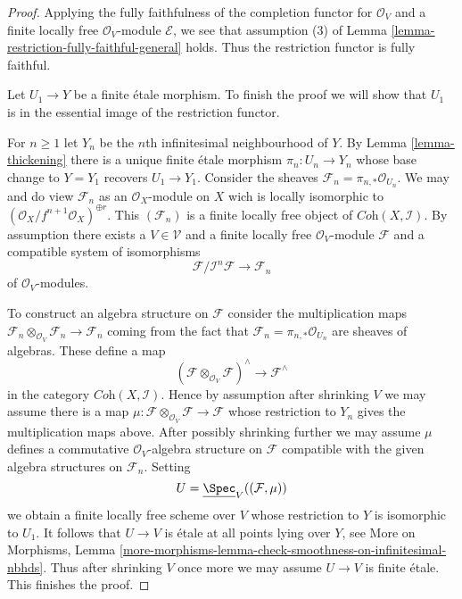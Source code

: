 \begin{proof}
Applying the fully faithfulness of the completion functor
for $\mathcal{O}_V$ and a finite locally free $\mathcal{O}_V$-module
$\mathcal{E}$, we see that assumption (3) of
Lemma \ref{lemma-restriction-fully-faithful-general}
holds. Thus the restriction functor is fully faithful.

\medskip\noindent
Let $U_1 \to Y$ be a finite \'etale morphism. To finish the proof
we will show that $U_1$ is in the essential image of the
restriction functor.

\medskip\noindent
For $n \geq 1$ let $Y_n$ be the $n$th infinitesimal neighbourhood of $Y$.
By Lemma \ref{lemma-thickening}
there is a unique finite \'etale morphism
$\pi_n : U_n \to Y_n$ whose base change to $Y = Y_1$
recovers $U_1 \to Y_1$.
Consider the sheaves $\mathcal{F}_n = \pi_{n, *}\mathcal{O}_{U_n}$.
We may and do view $\mathcal{F}_n$ as an $\mathcal{O}_X$-module on $X$
wich is locally isomorphic to
$(\mathcal{O}_X/f^{n + 1}\mathcal{O}_X)^{\oplus r}$.
This $(\mathcal{F}_n)$ is a finite locally free object of
$\textit{Coh}(X, \mathcal{I})$.
By assumption there exists a $V \in \mathcal{V}$
and a finite locally free $\mathcal{O}_V$-module $\mathcal{F}$
and a compatible system of isomorphisms
$$
\mathcal{F}/\mathcal{I}^n\mathcal{F} \to \mathcal{F}_n
$$
of $\mathcal{O}_V$-modules.

\medskip\noindent
To construct an algebra structure on $\mathcal{F}$ consider the multiplication
maps
$\mathcal{F}_n \otimes_{\mathcal{O}_V} \mathcal{F}_n \to \mathcal{F}_n$
coming from the fact that $\mathcal{F}_n = \pi_{n, *}\mathcal{O}_{U_n}$
are sheaves of algebras. These define a map
$$
(\mathcal{F}\otimes_{\mathcal{O}_V} \mathcal{F})^\wedge
\longrightarrow
\mathcal{F}^\wedge
$$
in the category $\textit{Coh}(X, \mathcal{I})$. Hence by assumption
after shrinking $V$ we may assume there is a map
$\mu : \mathcal{F}\otimes_{\mathcal{O}_V} \mathcal{F} \to \mathcal{F}$
whose restriction to $Y_n$ gives the multiplication maps above.
After possibly shrinking further we may assume $\mu$
defines a commutative $\mathcal{O}_V$-algebra
structure on $\mathcal{F}$ compatible with the given algebra
structures on $\mathcal{F}_n$.
Setting
$$
U = \underline{\Spec}_V((\mathcal{F}, \mu))
$$
we obtain a finite locally free scheme over $V$ whose restriction
to $Y$ is isomorphic to $U_1$. It follows that $U \to V$
is \'etale at all points lying over $Y$, see
More on Morphisms, Lemma
\ref{more-morphisms-lemma-check-smoothness-on-infinitesimal-nbhds}.
Thus after shrinking $V$ once more we may assume $U \to V$ is
finite \'etale. This finishes the proof.
\end{proof}


